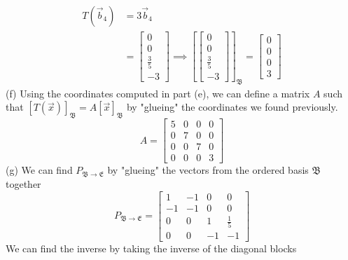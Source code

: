 \documentclass{report}
\begin{document}
$$
\begin{aligned}
T(\vec{b}_4) &= 3\vec{b}_4\\
&=\begin{bmatrix}0\\0\\\frac{3}{5}\\-3\end{bmatrix}\implies
\left[\begin{bmatrix}0\\0\\\frac{3}{5}\\-3\end{bmatrix}\right]_\mathfrak{B}=\begin{bmatrix}0\\0\\0\\3\end{bmatrix}
\end{aligned}
$$
(f) Using the coordinates computed in part (e),  we can define a matrix $A$ such that $[T(\vec{x})]_\mathfrak{B}=A[\vec{x}]_\mathfrak{B}$ by "glueing" the coordinates we found previously.
$$
A = \begin{bmatrix}
5&0&0&0\\
0&7&0&0\\
0&0&7&0\\
0&0&0&3
\end{bmatrix}
$$
(g) We can find $P_{\mathfrak{B}\rightarrow\mathfrak{E}}$ by "glueing" the vectors from the ordered basis $\mathfrak{B}$ together
$$
P_{\mathfrak{B}\rightarrow\mathfrak{E}} = \begin{bmatrix}
1&-1&0&0\\
-1&-1&0&0\\
0&0&1&\frac{1}{5}\\
0&0&-1&-1
\end{bmatrix}
$$
We can find the inverse by taking the inverse of the diagonal blocks
\end{document}
